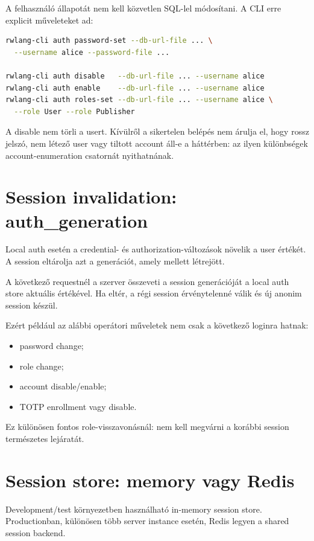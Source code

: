 A felhasználó állapotát nem kell közvetlen SQL-lel módosítani. A CLI erre explicit műveleteket ad:

\begin{lstlisting}[language=bash]
rwlang-cli auth password-set --db-url-file ... \
  --username alice --password-file ...

rwlang-cli auth disable   --db-url-file ... --username alice
rwlang-cli auth enable    --db-url-file ... --username alice
rwlang-cli auth roles-set --db-url-file ... --username alice \
  --role User --role Publisher
\end{lstlisting}

A disable nem törli a usert. Kívülről a sikertelen belépés nem árulja el, hogy rossz jelszó, nem létező user vagy tiltott account áll-e a háttérben: az ilyen különbségek account-enumeration csatornát nyithatnának.

\section{Session invalidation: auth\_generation}

Local auth esetén a credential- és authorization-változások növelik a user  értékét. A session eltárolja azt a generációt, amely mellett létrejött.

A következő requestnél a szerver összeveti a session generációját a local auth store aktuális értékével. Ha eltér, a régi session érvénytelenné válik és új anonim session készül.

Ezért például az alábbi operátori műveletek nem csak a következő loginra hatnak:

\begin{itemize}
  \item password change;
  \item role change;
  \item account disable/enable;
  \item TOTP enrollment vagy disable.
\end{itemize}

Ez különösen fontos role-visszavonásnál: nem kell megvárni a korábbi session természetes lejáratát.

\section{Session store: memory vagy Redis}

Development/test környezetben használható in-memory session store. Productionban, különösen több server instance esetén, Redis legyen a shared session backend.


